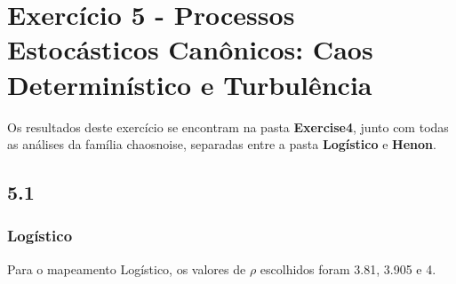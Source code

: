 
\section*{\large Exercício 5 - Processos Estocásticos Canônicos: Caos Determinístico e Turbulência}
%

Os resultados deste exercício se encontram na pasta \textbf{Exercise4}, junto com todas as análises da família chaosnoise, separadas entre a pasta \textbf{Logístico} e \textbf{Henon}.

\subsection*{5.1}
%

\subsubsection*{Logístico}
Para o mapeamento Logístico, os valores de $\rho$ escolhidos foram 3.81, 3.905 e 4. 

